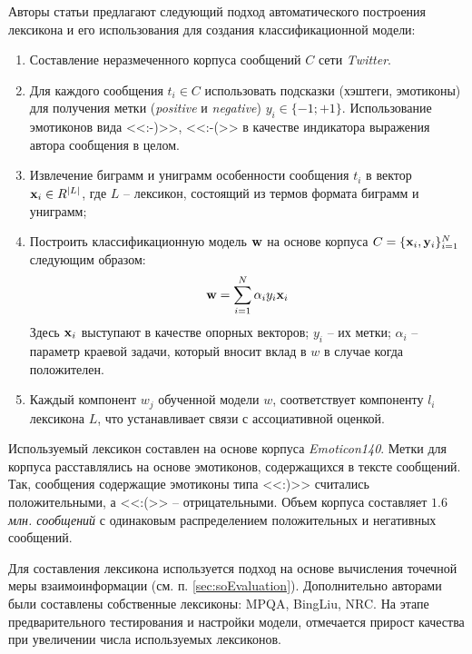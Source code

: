     Авторы статьи предлагают следующий подход автоматического построения
    лексикона и его использования для создания классификационной модели:
    \begin{enumerate}
        \item Составление неразмеченного корпуса сообщений $C$ сети {\it Twitter}.
        \item Для каждого сообщения $t_i \in C$ использовать подсказки
            (хэштеги, эмотиконы) для получения метки ({\it positive} и {\it negative})
            $y_i \in \{-1; +1\}$. Использование эмотиконов вида <<:-)>>, <<:-(>>
            в качестве индикатора выражения автора сообщения в целом.
        \item Извлечение биграмм и униграмм особенности сообщения $t_i$ в
            вектор ${\bf x}_i \in R^{|L|}$, где $L$ -- лексикон, состоящий из
            термов формата биграмм и униграмм;
        \item Построить классификационную модель ${\bf w}$ на основе корпуса
            $C = \{{\bf x}_i, {\bf y}_i \}_{i=1}^{N}$ следующим образом:
        \begin{equation}
            {\bf w} = \sum\limits_{i=1}^{N}\alpha_i y_i {\bf x}_i
        \end{equation}
        Здесь ${\bf x}_i$ выступают в качестве опорных векторов; $y_i$ -- их метки;
        $\alpha_i$ -- параметр краевой задачи, который вносит вклад в
        $w$ в случае когда положителен.
        \item Каждый компонент $w_j$ обученной модели $w$, соответствует компоненту $l_i$
            лексикона $L$, что устанавливает связи с ассоциативной оценкой.
    \end{enumerate}

    Используемый лексикон составлен на основе \twitter корпуса {\it Emoticon140}.
    Метки для корпуса расставлялись на основе эмотиконов, содержащихся в
    тексте сообщений.
    Так, сообщения содержащие эмотиконы типа <<:)>> считались положительными,
    а <<:(>> -- отрицательными.
    Объем корпуса составляет {\it $1.6$ млн. сообщений} с одинаковым распределением
    положительных и негативных сообщений.

    Для составления лексикона используется подход на основе вычисления
    точечной меры взаимоинформации (см. п. \ref{sec:soEvaluation}).
    Дополнительно авторами были составлены собственные лексиконы: MPQA, BingLiu, NRC.
    На этапе предварительного тестирования и настройки модели, отмечается прирост
    качества при увеличении числа используемых лексиконов.

